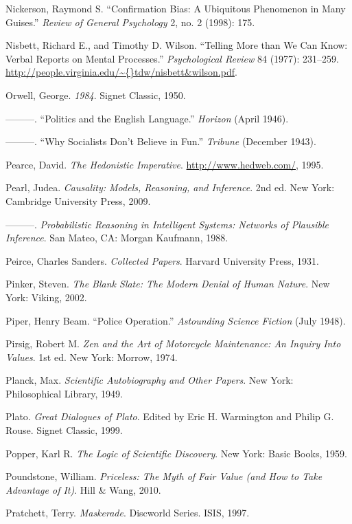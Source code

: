 \documentclass[letterpaper]{book}
\begin{document}
{
 Nickerson, Raymond S. ``Confirmation Bias: A
Ubiquitous Phenomenon in Many Guises.''
\textit{Review of General Psychology} 2, no. 2 (1998): 175.}

{
 Nisbett, Richard E., and Timothy D. Wilson.
``Telling More than We Can Know: Verbal Reports on
Mental Processes.'' \textit{Psychological Review} 84
(1977): 231--259.
\url{http://people.virginia.edu/\~{}tdw/nisbett\&wilson.pdf}.}

{
 Orwell, George. \textit{1984}. Signet Classic, 1950.}

{
 {}---{}---{}---. ``Politics and the English
Language.'' \textit{Horizon} (April 1946).}

{
 {}---{}---{}---. ``Why Socialists
Don't Believe in Fun.''
\textit{Tribune} (December 1943).}

{
 Pearce, David. \textit{The Hedonistic Imperative}.
\url{http://www.hedweb.com/}, 1995.}

{
 Pearl, Judea. \textit{Causality: Models, Reasoning, and
Inference}. 2nd ed. New York: Cambridge University Press, 2009.}

{
 {}---{}---{}---. \textit{Probabilistic Reasoning in Intelligent
Systems: Networks of Plausible Inference}. San Mateo, CA: Morgan
Kaufmann, 1988.}

{
 Peirce, Charles Sanders. \textit{Collected Papers}. Harvard
University Press, 1931.}

{
 Pinker, Steven. \textit{The Blank Slate: The Modern Denial of
Human Nature}. New York: Viking, 2002.}

{
 Piper, Henry Beam. ``Police
Operation.'' \textit{Astounding Science Fiction}
(July 1948).}

{
 Pirsig, Robert M. \textit{Zen and the Art of Motorcycle
Maintenance: An Inquiry Into Values}. 1st ed. New York: Morrow, 1974.}

{
 Planck, Max. \textit{Scientific Autobiography and Other Papers}.
New York: Philosophical Library, 1949.}

{
 Plato. \textit{Great Dialogues of Plato}. Edited by Eric H.
Warmington and Philip G. Rouse. Signet Classic, 1999.}

{
 Popper, Karl R. \textit{The Logic of Scientific Discovery}. New
York: Basic Books, 1959.}

{
 Poundstone, William. \textit{Priceless: The Myth of Fair Value
(and How to Take Advantage of It)}. Hill \& Wang, 2010.}

{
 Pratchett, Terry. \textit{Maskerade}. Discworld Series. ISIS,
1997.}
\end{document}
